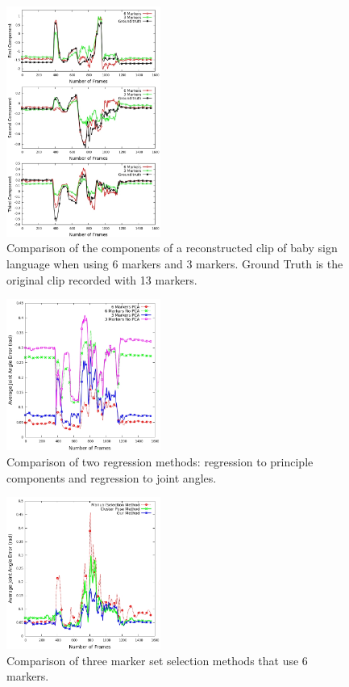 \begin{figure}[ht]
  \centering
  \includegraphics[trim = 28mm 0mm 0mm 0mm,
width=0.45\textwidth]{images/Components_babySigns1.jpg} %
  \caption{Comparison of the components of a reconstructed clip of baby
sign language when using 6 markers and 3 markers. Ground Truth is
the original clip recorded with 13 markers.}
  \label{fig:BabySigns_comps}
\end{figure}

\begin{figure}[ht]
  \centering
  \includegraphics[trim = 28mm 0mm 0mm 0mm,
width=0.45\textwidth]{images/avgError_6_3_jangles_babySigns1.jpg} %
  \caption{Comparison of two regression methods: regression to principle
components and regression to joint angles.}
  \label{fig:PCA_noPCA}
\end{figure}

\begin{figure}[ht]
  \centering
  \includegraphics[trim = 28mm 0mm 0mm 0mm,
width=0.45\textwidth]{images/avgError_Marker_sets.jpg} %
  \caption{Comparison of three marker set selection methods that use 6 markers.}
  \label{fig:3_methods}
\end{figure}


